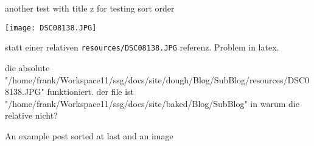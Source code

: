 \documentclass[a4paper,10pt]{scrbook}
\begin{document}
another test with title z for testing sort order

\texttt{[image: DSC08138.JPG]}

statt einer relativen \texttt{resources/DSC08138.JPG} referenz. Problem
in latex.

die absolute
"/home/frank/Workspace11/ssg/docs/site/dough/Blog/SubBlog/resources/DSC08138.JPG"
funktioniert. der file ist
"/home/frank/Workspace11/ssg/docs/site/baked/Blog/SubBlog" in warum die
relative nicht?

An example post sorted at last and an image


\printindex
\end{document}
